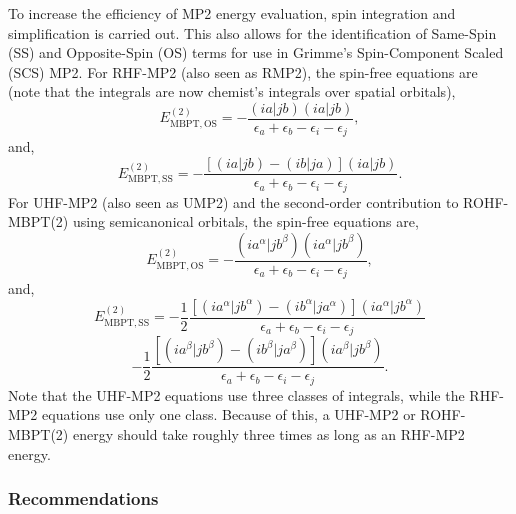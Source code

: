To increase the efficiency of MP2 energy evaluation, spin integration
and simplification is carried out. This also allows for the identification of
Same-Spin (SS) and Opposite-Spin (OS) terms for use in Grimme's Spin-Component
Scaled (SCS) MP2. For RHF-MP2 (also seen as RMP2), the spin-free equations are
(note that the integrals are now chemist's integrals over spatial orbitals),
\begin{equation}
E_{\mathrm{MBPT,OS}}^{(2)} = - \frac{(ia|jb)(ia|jb)}{\epsilon_a + \epsilon_b - \epsilon_i - \epsilon_j},
\end{equation}
and, 
\begin{equation}
E_{\mathrm{MBPT,SS}}^{(2)} = - \frac{[(ia|jb)-(ib|ja)](ia|jb)}{\epsilon_a + \epsilon_b - \epsilon_i - \epsilon_j}.
\end{equation}
For UHF-MP2 (also seen as UMP2) and the second-order contribution to ROHF-MBPT(2) using semicanonical orbitals, the spin-free equations are,
\begin{equation}
E_{\mathrm{MBPT,OS}}^{(2)} = - \frac{(ia^\alpha|jb^\beta)(ia^\alpha|jb^\beta)}{\epsilon_a + \epsilon_b - \epsilon_i - \epsilon_j},
\end{equation}
and, 
\begin{equation}
E_{\mathrm{MBPT,SS}}^{(2)} = - \frac{1}{2}\frac{[(ia^\alpha|jb^\alpha)-(ib^\alpha|ja^\alpha)](ia^\alpha|jb^\alpha)}{\epsilon_a + \epsilon_b - \epsilon_i - \epsilon_j}
\end{equation}
\[
                           - \frac{1}{2}\frac{[(ia^\beta|jb^\beta)-(ib^\beta|ja^\beta)](ia^\beta|jb^\beta)}{\epsilon_a + \epsilon_b - \epsilon_i - \epsilon_j}.
\]
Note that the UHF-MP2 equations use three classes of integrals, while the
RHF-MP2 equations use only one class. Because of this, a UHF-MP2 or
ROHF-MBPT(2) energy should take roughly three times as long as an RHF-MP2
energy.

\subsubsection{Recommendations}

